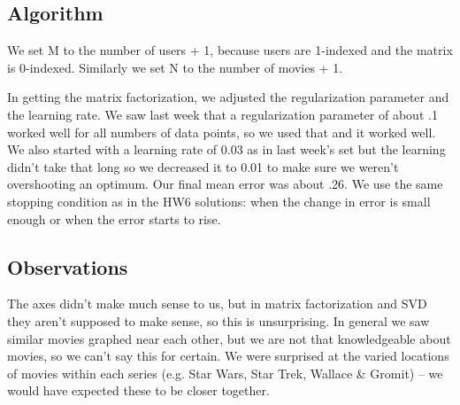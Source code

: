\subsection{Algorithm}
We set M to the number of users + 1, because users are 1-indexed and the matrix is 0-indexed. Similarly we set N to the number of movies + 1.

In getting the matrix factorization, we adjusted the regularization parameter and the learning rate. We saw last week that a regularization parameter of about .1 worked well for all numbers of data points, so we used that and it worked well. We also started with a learning rate of 0.03 as in last week's set but the learning didn't take that long so we decreased it to 0.01 to make sure we weren't overshooting an optimum. Our final mean error was about .26. We use the same stopping condition as in the HW6 solutions: when the change in error is small enough or when the error starts to rise.

\subsection{Observations}
The axes didn't make much sense to us, but in matrix factorization and SVD they aren't supposed to make sense, so this is unsurprising. In general we saw similar movies graphed near each other, but we are not that knowledgeable about movies, so we can't say this for certain. We were surprised at the varied locations of movies within each series (e.g. Star Wars, Star Trek, Wallace \& Gromit) -- we would have expected these to be closer together.

